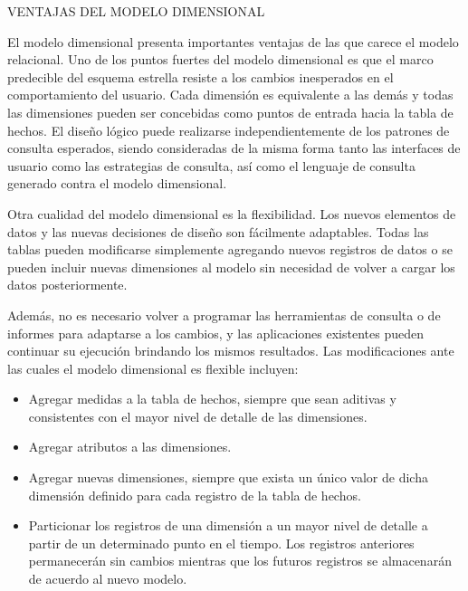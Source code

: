 VENTAJAS DEL MODELO DIMENSIONAL \newline

El modelo dimensional presenta importantes ventajas de las que carece el modelo relacional. Uno de los puntos fuertes del modelo dimensional es que el marco predecible del esquema estrella resiste a los cambios inesperados en el comportamiento del usuario. Cada dimensión es equivalente a las demás y todas las dimensiones pueden ser concebidas como puntos de entrada hacia la tabla de hechos. El diseño lógico puede realizarse independientemente de los patrones de consulta esperados, siendo consideradas de la misma forma tanto las interfaces de usuario como las estrategias de consulta, así como el lenguaje de consulta generado contra el modelo dimensional. \newline 


Otra cualidad del modelo dimensional es la flexibilidad. Los nuevos elementos de datos y las nuevas decisiones de diseño son fácilmente adaptables. Todas las tablas pueden modificarse simplemente agregando nuevos registros de datos o se pueden incluir nuevas dimensiones al modelo sin necesidad de volver a cargar los datos posteriormente. \newline

Además, no es necesario volver a programar las herramientas de consulta o de informes para adaptarse a los cambios, y las aplicaciones existentes pueden continuar su ejecución brindando los mismos resultados. Las modificaciones ante las cuales el modelo dimensional es flexible incluyen: \newline




\begin{itemize}
\item Agregar medidas a la tabla de hechos, siempre que sean aditivas y consistentes con el mayor nivel de detalle de las dimensiones. 
\item Agregar atributos a las dimensiones.  
\item Agregar nuevas dimensiones, siempre que exista un único valor de dicha dimensión definido para cada registro de la tabla de hechos. 
\item Particionar los registros de una dimensión a un mayor nivel de detalle a partir de un determinado punto en el tiempo. Los registros anteriores permanecerán sin cambios mientras que los futuros registros se almacenarán de acuerdo al nuevo modelo. 
\end{itemize}



